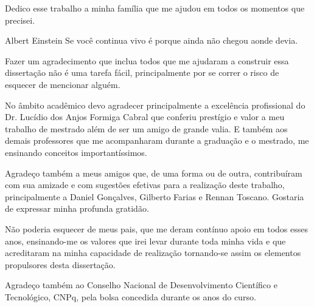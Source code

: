 \documentclass[oneside,normaltoc,espacoumemeio,PGTEXdissertacao]{pgeeltex}
\begin{document}


\folhaderostoPGTEX
\folhadeaprovacaoPGTEX

%
\begin{dedicatoriaPGTEX}
Dedico esse trabalho a minha família que me ajudou em todos os momentos
que precisei.
\end{dedicatoriaPGTEX}




\begin{epigrafePGTEX}{Albert Einstein} 
Se você continua vivo é porque ainda não chegou aonde devia.
\end{epigrafePGTEX}


\begin{agradecimentosPGTEX}
Fazer um agradecimento que inclua todos que me ajudaram a construir
essa dissertação não é uma tarefa fácil, principalmente por se correr
o risco de esquecer de mencionar alguém.

No âmbito acadêmico devo agradecer principalmente a excelência profissional do
Dr. Lucídio dos Anjos Formiga Cabral que conferiu prestígio e valor a meu
trabalho de mestrado além de ser um amigo de grande valia. E também aos demais
professores que me acompanharam durante a graduação e o mestrado, me ensinando
conceitos importantíssimos.

Agradeço também a meus amigos que, de uma forma ou de outra,
contribuíram com sua amizade e com sugestões efetivas para a realização deste
trabalho, principalmente a Daniel Gonçalves, Gilberto Farias e Rennan Toscano. 
Gostaria de expressar minha profunda gratidão.

Não poderia esquecer de meus pais, que me deram contínuo apoio em todos esses
anos, ensinando-me os valores que irei levar durante toda minha vida e que
acreditaram na minha capacidade de realização tornando-se assim os elementos
propulsores desta dissertação. 

Agradeço também ao Conselho Nacional de Desenvolvimento Científico e
Tecnológico, CNPq, pela bolsa concedida durante os anos do curso.

\end{agradecimentosPGTEX}
\end{document}
